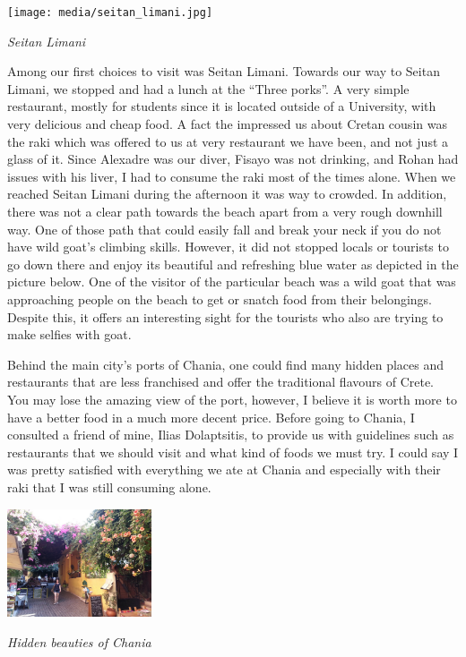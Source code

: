 \documentclass[10pt,a4paper]{article} %
\begin{document}
\begin{multicols}{3}
\begin{center}
	\texttt{[image: media/seitan\_limani.jpg]}
	\par\textit{Seitan Limani}
\end{center}


Among our first choices to visit was Seitan Limani. 
Towards our way to Seitan Limani, we stopped and had a lunch at the 
``Three porks''. 
A very simple restaurant, mostly for students since it is located outside 
of a University, with very delicious and cheap food. 
A fact the impressed us about Cretan cousin was the raki which was offered to us 
at very restaurant we have been, and not just a glass of it. 
Since Alexadre was our diver, Fisayo was not drinking, and Rohan had issues with his 
liver, I had to consume the raki most of the times alone. 
When we reached Seitan Limani during the afternoon it was way to crowded. 
In addition, there was not a clear path towards the beach apart from a very 
rough downhill way. 
One of those path that could easily fall and break your neck if you do not have 
wild goat's climbing skills. 
However, it did not stopped locals or tourists to go down there and enjoy its 
beautiful and refreshing blue water as depicted in the picture below. 
One of the visitor of the particular beach was a wild goat that was approaching 
people on the beach to get or snatch food from their belongings. 
Despite this, it offers an interesting sight for the tourists who also are trying 
to make selfies with goat.   


Behind the main city's ports of Chania, one could find many hidden places and 
restaurants that are less franchised and offer the traditional flavours of 
Crete. 
You may lose the amazing view of the port, however, I believe it is worth more 
to have a better food in a much more decent price. 
Before going to Chania, I consulted a friend of mine, Ilias Dolaptsitis, 
to provide us with guidelines such as restaurants that we should visit and what 
kind of foods we must try. 
I could say I was pretty satisfied with everything we ate at Chania and especially 
with their raki that I was still consuming alone. 


\begin{center}
	\includegraphics[width=0.32\textwidth]{media/chania_2.jpg}
	\par\textit{Hidden beauties of Chania}
\end{center}



\end{multicols}
\end{document}
